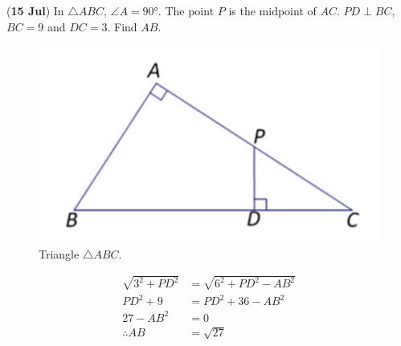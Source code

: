 \documentclass[12pt,answers]{exam}
\newcommand{\qndate}[2]{(\textbf{#1 #2})}
\begin{document}
\begin{questions}
	\question \qndate{15}{Jul} In $\triangle ABC$, $\angle A = \ang{90}$. The point
	$P$ is the midpoint of $AC$. $PD \perp BC$, $BC = 9$ and $DC = 3$.
	Find $AB$.
	\begin{figure}[htpb]
		\centering
		\includegraphics[scale=.5]{images/0715_Tri.jpeg}
		\caption{Triangle $\triangle ABC$.}
		\label{fig:0715_Tri}
	\end{figure}
	\begin{solution}
		\begin{align*}
			\sqrt{3^2 + {PD}^2} & = \sqrt{6^2 + {PD}^2 - {AB}^2} \\
			{PD}^2 + 9          & = {PD}^2 + 36 - {AB}^2         \\
			27 - {AB}^2         & = 0                            \\
			\therefore AB       & = \sqrt{27}
		\end{align*}
	\end{solution}
\end{questions}
\end{document}
